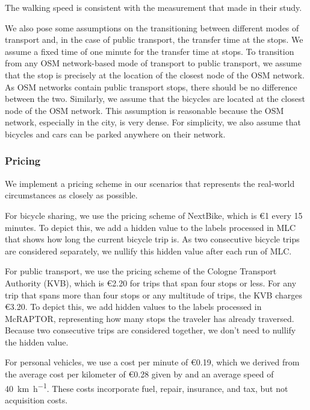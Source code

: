 The walking speed is consistent with the measurement that  made in their study.

We also pose some assumptions on the transitioning between different modes of transport and, in the case of public transport, the transfer time at the stops.
We assume a fixed time of one minute for the transfer time at stops.
To transition from any OSM network-based mode of transport to public transport, we assume that the stop is precisely at the location of the closest node of the OSM network.
As OSM networks contain public transport stops, there should be no difference between the two.
Similarly, we assume that the bicycles are located at the closest node of the OSM network.
This assumption is reasonable because the OSM network, especially in the city, is very dense.
For simplicity, we also assume that bicycles and cars can be parked anywhere on their network.


\subsubsection{Pricing}
\label{subs:pricing}

We implement a pricing scheme in our scenarios that represents the real-world circumstances as closely as possible.

For bicycle sharing, we use the pricing scheme of NextBike, which is \euro{1} every 15 minutes.
To depict this, we add a hidden value to the labels processed in MLC that shows how long the current bicycle trip is.
As two consecutive bicycle trips are considered separately, we nullify this hidden value after each run of MLC.

For public transport, we use the pricing scheme of the Cologne Transport Authority (KVB), which is \euro{2.20} for trips that span four stops or less.
For any trip that spans more than four stops or any multitude of trips, the KVB charges \euro{3.20}.
To depict this, we add hidden values to the labels processed in McRAPTOR, representing how many stops the traveler has already traversed.
Because two consecutive trips are considered together, we don't need to nullify the hidden value.

For personal vehicles, we use a cost per minute of \euro{0.19}, which we derived from the average cost per kilometer of \euro{0.28} given by \cite{kieferSpritkostenrechner2023} and an average speed of \SI{40}{\kilo\meter\per\hour}.
These costs incorporate fuel, repair, insurance, and tax, but not acquisition costs.

